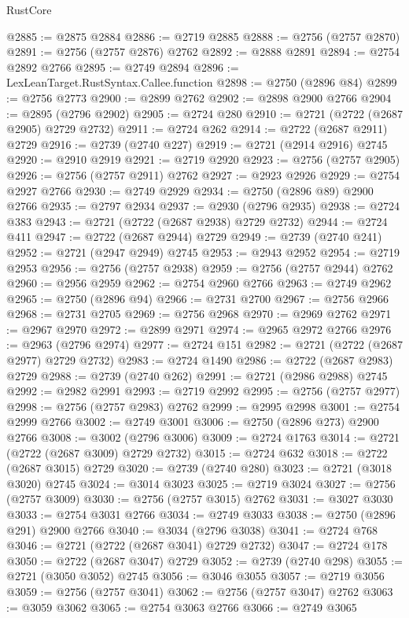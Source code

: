 \begin{lexlean}{RustCore}
\begin{coremodule}
@2885 := @2875 @2884
@2886 := @2719 @2885
@2888 := @2756 (@2757 @2870)
@2891 := @2756 (@2757 @2876) @2762
@2892 := @2888 @2891
@2894 := @2754 @2892 @2766
@2895 := @2749 @2894
@2896 := LexLeanTarget.RustSyntax.Callee.function
@2898 := @2750 (@2896 @84)
@2899 := @2756 @2773
@2900 := @2899 @2762
@2902 := @2898 @2900 @2766
@2904 := @2895 (@2796 @2902)
@2905 := @2724 @280
@2910 := @2721 (@2722 (@2687 @2905) @2729 @2732)
@2911 := @2724 @262
@2914 := @2722 (@2687 @2911) @2729
@2916 := @2739 (@2740 @227)
@2919 := @2721 (@2914 @2916) @2745
@2920 := @2910 @2919
@2921 := @2719 @2920
@2923 := @2756 (@2757 @2905)
@2926 := @2756 (@2757 @2911) @2762
@2927 := @2923 @2926
@2929 := @2754 @2927 @2766
@2930 := @2749 @2929
@2934 := @2750 (@2896 @89) @2900 @2766
@2935 := @2797 @2934
@2937 := @2930 (@2796 @2935)
@2938 := @2724 @383
@2943 := @2721 (@2722 (@2687 @2938) @2729 @2732)
@2944 := @2724 @411
@2947 := @2722 (@2687 @2944) @2729
@2949 := @2739 (@2740 @241)
@2952 := @2721 (@2947 @2949) @2745
@2953 := @2943 @2952
@2954 := @2719 @2953
@2956 := @2756 (@2757 @2938)
@2959 := @2756 (@2757 @2944) @2762
@2960 := @2956 @2959
@2962 := @2754 @2960 @2766
@2963 := @2749 @2962
@2965 := @2750 (@2896 @94)
@2966 := @2731 @2700
@2967 := @2756 @2966
@2968 := @2731 @2705
@2969 := @2756 @2968
@2970 := @2969 @2762
@2971 := @2967 @2970
@2972 := @2899 @2971
@2974 := @2965 @2972 @2766
@2976 := @2963 (@2796 @2974)
@2977 := @2724 @151
@2982 := @2721 (@2722 (@2687 @2977) @2729 @2732)
@2983 := @2724 @1490
@2986 := @2722 (@2687 @2983) @2729
@2988 := @2739 (@2740 @262)
@2991 := @2721 (@2986 @2988) @2745
@2992 := @2982 @2991
@2993 := @2719 @2992
@2995 := @2756 (@2757 @2977)
@2998 := @2756 (@2757 @2983) @2762
@2999 := @2995 @2998
@3001 := @2754 @2999 @2766
@3002 := @2749 @3001
@3006 := @2750 (@2896 @273) @2900 @2766
@3008 := @3002 (@2796 @3006)
@3009 := @2724 @1763
@3014 := @2721 (@2722 (@2687 @3009) @2729 @2732)
@3015 := @2724 @632
@3018 := @2722 (@2687 @3015) @2729
@3020 := @2739 (@2740 @280)
@3023 := @2721 (@3018 @3020) @2745
@3024 := @3014 @3023
@3025 := @2719 @3024
@3027 := @2756 (@2757 @3009)
@3030 := @2756 (@2757 @3015) @2762
@3031 := @3027 @3030
@3033 := @2754 @3031 @2766
@3034 := @2749 @3033
@3038 := @2750 (@2896 @291) @2900 @2766
@3040 := @3034 (@2796 @3038)
@3041 := @2724 @768
@3046 := @2721 (@2722 (@2687 @3041) @2729 @2732)
@3047 := @2724 @178
@3050 := @2722 (@2687 @3047) @2729
@3052 := @2739 (@2740 @298)
@3055 := @2721 (@3050 @3052) @2745
@3056 := @3046 @3055
@3057 := @2719 @3056
@3059 := @2756 (@2757 @3041)
@3062 := @2756 (@2757 @3047) @2762
@3063 := @3059 @3062
@3065 := @2754 @3063 @2766
@3066 := @2749 @3065

\end{coremodule}
\end{lexlean}
